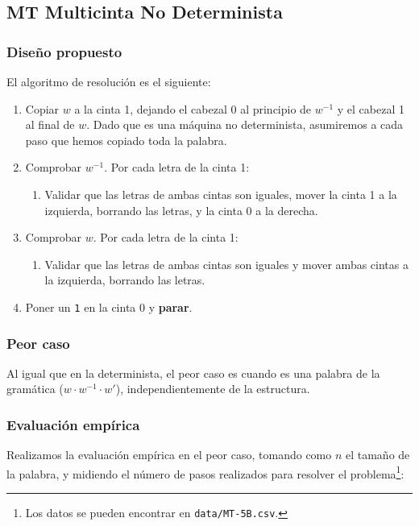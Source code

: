 
\subsection{MT Multicinta No Determinista}

\subsubsection*{Diseño propuesto}
El algoritmo de resolución es el siguiente:

\begin{enumerate}
    \item Copiar $w$ a la cinta 1, dejando el cabezal 0 al principio de $w^{-1}$ y el cabezal 1 al final de $w$. Dado que es una máquina no determinista, asumiremos a cada paso que hemos copiado toda la palabra.
    \item Comprobar $w^{-1}$. Por cada letra de la cinta 1:
    \begin{enumerate}[1.]
        \item Validar que las letras de ambas cintas son iguales, mover la cinta 1 a la izquierda, borrando las letras, y la cinta 0 a la derecha.
    \end{enumerate}
    \item Comprobar $w$. Por cada letra de la cinta 1:
    \begin{enumerate}[1.]
        \item Validar que las letras de ambas cintas son iguales y mover ambas cintas a la izquierda, borrando las letras.
    \end{enumerate}
    \item Poner un \texttt{1} en la cinta 0 y \textbf{parar}.
\end{enumerate}



\subsubsection*{Peor caso}
Al igual que en la determinista, el peor caso es cuando es una palabra de la gramática ($w \cdot w^{-1} \cdot w'$), independientemente de la estructura.


\subsubsection*{Evaluación empírica}
Realizamos la evaluación empírica en el peor caso, tomando como $n$ el tamaño de la palabra, y midiendo el número de pasos realizados para resolver el problema\footnote{Los datos se pueden encontrar en \texttt{data/MT-5B.csv}.}:

